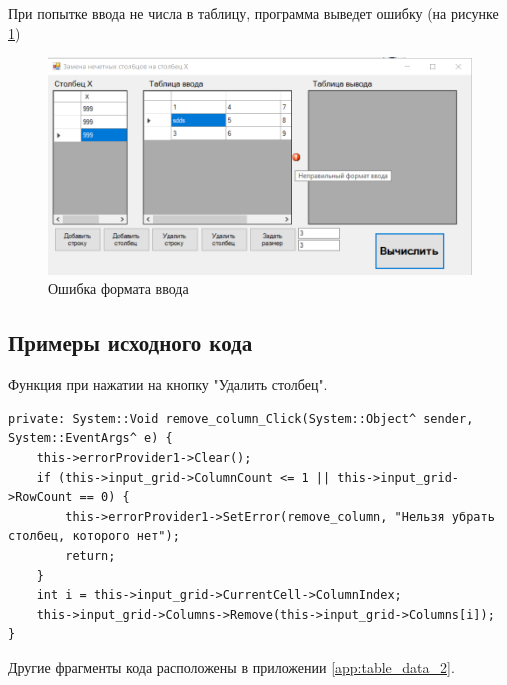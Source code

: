 При попытке ввода не числа в таблицу, программа выведет ошибку (на рисунке \ref{task5_launch3})
\begin{figure}[H]
    \centering
    \includegraphics[width=1\linewidth]{lections/img/task5_launch3.png}
    \caption{Ошибка формата ввода}
    \label{task5_launch3}
\end{figure}



\subsection{Примеры исходного кода}


Функция при нажатии на кнопку "Удалить столбец".
\begin{verbatim}
private: System::Void remove_column_Click(System::Object^ sender, System::EventArgs^ e) {
	this->errorProvider1->Clear();
	if (this->input_grid->ColumnCount <= 1 || this->input_grid->RowCount == 0) {
		this->errorProvider1->SetError(remove_column, "Нельзя убрать столбец, которого нет");
		return;
	}
	int i = this->input_grid->CurrentCell->ColumnIndex;
	this->input_grid->Columns->Remove(this->input_grid->Columns[i]);
}
\end{verbatim}
Другие фрагменты кода расположены в приложении \ref{app:table_data_2}.

\sectionbreak